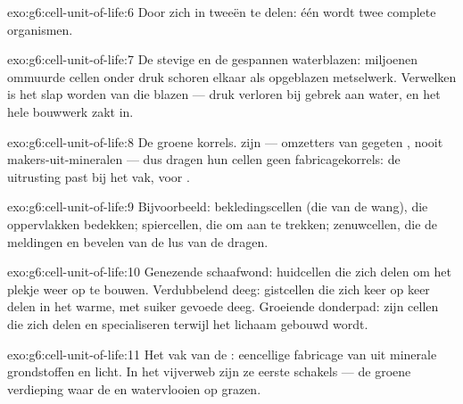 \begin{solution}{exo:g6:cell-unit-of-life:6}
Door zich in tweeën te delen: één  wordt twee complete organismen.
\end{solution}

\begin{solution}{exo:g6:cell-unit-of-life:7}
De stevige  en de gespannen waterblazen: miljoenen ommuurde cellen
onder druk schoren elkaar als opgeblazen metselwerk. Verwelken is het
slap worden van die blazen --- druk verloren bij gebrek aan water, en het
hele bouwwerk zakt in.
\end{solution}

\begin{solution}{exo:g6:cell-unit-of-life:8}
De groene korrels.  zijn  --- omzetters van gegeten
, nooit makers-uit-mineralen --- dus dragen hun cellen
geen fabricagekorrels: de uitrusting past bij het vak,  voor .
\end{solution}

\begin{solution}{exo:g6:cell-unit-of-life:9}
Bijvoorbeeld: bekledingscellen (die van de wang), die oppervlakken
bedekken; spiercellen, die  om aan  te trekken;
zenuwcellen, die de meldingen en bevelen van de lus van de  dragen.
\end{solution}

\begin{solution}{exo:g6:cell-unit-of-life:10}
Genezende schaafwond: huidcellen die zich delen om het plekje weer op te
bouwen. Verdubbelend deeg: gistcellen die zich keer op keer delen in het
warme, met suiker gevoede deeg. Groeiende donderpad: zijn cellen die zich
delen en specialiseren terwijl het lichaam gebouwd wordt.
\end{solution}

\begin{solution}{exo:g6:cell-unit-of-life:11}
Het vak van de : eencellige fabricage van 
uit minerale grondstoffen en licht. In het vijverweb zijn ze eerste
schakels --- de groene verdieping waar de  en watervlooien op
grazen.
\end{solution}

